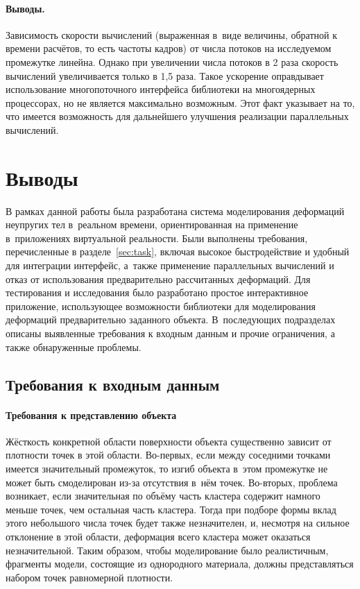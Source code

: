 \documentclass[a4paper, 14pt, titlepage]{extarticle}
\let\oldsection\section
\renewcommand{\section}{\newpage\oldsection}
\begin{document}
      \paragraph{Выводы.} Зависимость скорости вычислений (выраженная в~виде величины, обратной к
      времени расчётов, то есть частоты кадров) от числа потоков на исследуемом промежутке линейна. Однако
      при увеличении числа потоков в 2 раза скорость вычислений увеличивается только в 1,5 раза.
      Такое ускорение оправдывает использование многопоточного интерфейса библиотеки на многоядерных
      процессорах, но не является максимально возможным. Этот факт указывает на то, что имеется
      возможность для дальнейшего улучшения реализации параллельных вычислений.

  \section{Выводы}\label{sec:conclusion}

    В рамках данной работы была разработана система моделирования деформаций неупругих тел
    в~реальном времени, ориентированная на применение в~приложениях виртуальной реальности. Были
    выполнены требования, перечисленные в разделе~\ref{sec:task}, включая высокое быстродействие и
    удобный для интеграции интерфейс, а~также применение параллельных вычислений и отказ от
    использования предварительно рассчитанных деформаций. Для тестирования и исследования было
    разработано простое интерактивное приложение, использующее возможности библиотеки для
    моделирования деформаций предварительно заданного объекта. В~последующих подразделах описаны
    выявленные требования к входным данным и прочие ограничения, а также обнаруженные проблемы.

    \subsection{Требования к входным данным}

      \paragraph{Требования к представлению объекта}
      Жёсткость конкретной области поверхности объекта существенно зависит от плотности точек в этой
      области. Во-первых, если между соседними точками имеется значительный промежуток, то изгиб
      объекта в~этом промежутке не может быть смоделирован из-за отсутствия в~нём точек. Во-вторых,
      проблема возникает, если значительная по объёму часть кластера содержит намного меньше точек,
      чем остальная часть кластера. Тогда при подборе формы вклад этого небольшого числа точек будет
      также незначителен, и, несмотря на сильное отклонение в этой области, деформация всего
      кластера может оказаться незначительной. Таким образом, чтобы моделирование было реалистичным,
      фрагменты модели, состоящие из однородного материала, должны представляться набором точек
      равномерной плотности.
\end{document}
